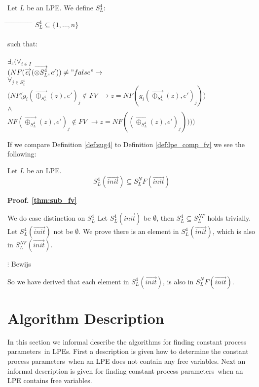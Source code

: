 \index{}\documentclass[a4paper,10pt]{article}
\theoremstyle{plain}
\theoremstyle{definition}
\newcommand{\ovr}{\overrightarrow}
\newcommand{\pps}{process parameters}
\newcommand{\tb}{\textbf}
\newcommand{\tab}{\hspace*{5.mm} \= \hspace*{5.mm} \= \hspace*{5.mm} \= \hspace*{5.mm} \= \hspace*{5.mm} \= \hspace*{5.mm}  \= \hspace*{5.mm}  \= \hspace*{5.mm}  \= \hspace*{5.mm} \= \hspace*{5.mm} \= \hspace*{5.mm}  \= \hspace*{5.mm}  \= \hspace*{5.mm}\kill}
\begin{document}
\begin{defn} \label{def:sug4} Let $L$ be an LPE. We define $S_L^4$:

\begin{tabbing}
\tab
$ S_L^4 \subseteq \lbrace 1, \ldots, n \rbrace $ \\ \\
such that:\\ \\
$\exists_{z}( \forall_{i \in I}$ \\
\>$(NF( \ovr{c_i} ( \ovr{\otimes{S_L^4}}, e' ) ) \not= "false" \rightarrow $\\
\> \> $\forall_{j \in S_L^4}$\\
\>\>\>$(NF(g_i(\ovr{\oplus_{S_L^4}}(z), e' )_j \not\in FV$ \>\>\>\>\>\>\> $\rightarrow  z =  NF( g_i(\ovr{\oplus_{S_L^4}}(z), e' )_j))$\\
\>\>$\wedge$\\
\>\>\>$NF(\ovr{\oplus_{S_L^4}}(z), e' )_j \not\in FV$ \>\>\>\>\>\>\> $\rightarrow z = NF((\ovr{\oplus_{S_L^4}}(z), e' )_j))))$
\end{tabbing}

\end{defn}

If we compare Definition \ref{def:sug4} to Definition \ref{def:lpe_comp_fv} we see the following:
\begin{thm} Let $L$ be an LPE. \label{thm:sub_fv}
$$S_L^4(\ovr{init}) \subseteq S_L^NF(\ovr{init}) $$
\end{thm} 
\begin{flushleft}
\tb{Proof. \ref{thm:sub_fv}}
\end{flushleft}
We do case distinction on $S_L^4$
Let $S_L^4(\ovr{init})$ be $\emptyset$, then $S_L^4 \subseteq S_L^{NF}$ holds trivially.
Let $S_L^4(\ovr{init})$ not be $\emptyset$. We prove there is an element in $S_L^4(\ovr{init})$, which is also in $S_L^{NF}(\ovr{init})$.
\begin{tabbing}
$\vdots$ Bewijs
\end{tabbing}

So we have derived that each element in $S_L^4(\ovr{init})$, is also in $S_L^NF(\ovr{init})$.


\section{Algorithm Description}
In this section we informal describe the algorithms for finding constant \pps\ in LPEs. First a description is given how to determine the constant \pps\ when an LPE does not contain any free variables. Next an informal description is given for finding constant \pps\ when an LPE contains free variables.
\end{document}
